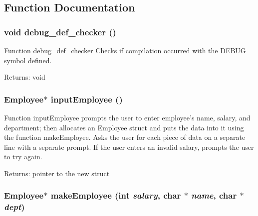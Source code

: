 \subsection{Function Documentation}
\subsubsection{\setlength{\rightskip}{0pt plus 5cm}void debug\_\-def\_\-checker ()}\label{mystructs_8h_5b44943f1d428a1652c893f0d0f25368}


Function debug\_\-def\_\-checker Checks if compilation occurred with the DEBUG symbol defined. \begin{Desc}
\item[Returns:]void \end{Desc}
\subsubsection{\setlength{\rightskip}{0pt plus 5cm}\bf{Employee}$\ast$ input\-Employee ()}\label{mystructs_8h_c2db36c05760bafb3ad1bce84a7a3608}


Function input\-Employee prompts the user to enter employee's name, salary, and department; then allocates an Employee struct and puts the data into it using the function make\-Employee. Asks the user for each piece of data on a separate line with a separate prompt. If the user enters an invalid salary, prompts the user to try again. \begin{Desc}
\item[Returns:]pointer to the new struct \end{Desc}
\subsubsection{\setlength{\rightskip}{0pt plus 5cm}\bf{Employee}$\ast$ make\-Employee (int {\em salary}, char $\ast$ {\em name}, char $\ast$ {\em dept})}\label{mystructs_8h_cf2a4171bc057d7439d14e689a460de9}



